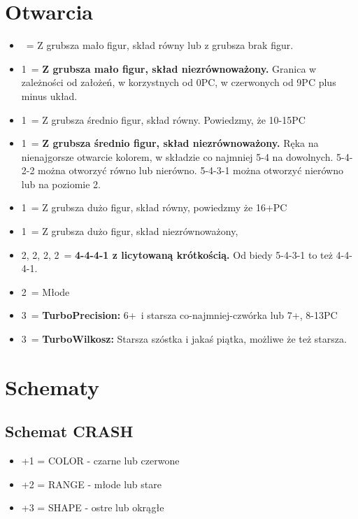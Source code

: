 \documentclass[12pt, a4paper]{article}
\begin{document}
\section{Otwarcia}
\begin{itemize}
    \item \pass\ = Z grubsza mało figur, skład równy lub z grubsza brak figur.
    \item 1\clubs\ = \textbf{Z grubsza mało figur, skład niezrównoważony.} Granica w zależności od założeń, w korzystnych od 0PC,
    w czerwonych od 9PC plus minus układ.
    \item 1\diams\ = Z grubsza średnio figur, skład równy. Powiedzmy, że 10-15PC
    \item 1\hearts\ = \textbf{Z grubsza średnio figur, skład niezrównoważony.}
    Ręka na nienajgorsze otwarcie kolorem, w składzie co najmniej 5-4 na dowolnych. 5-4-2-2 można otworzyć równo lub nierówno.
    5-4-3-1 można otworzyć nierówno lub na poziomie 2.
    \item 1\spades\ = Z grubsza dużo figur, skład równy, powiedzmy że 16+PC \fonce 
    \item 1\nt\ = Z grubsza dużo figur, skład niezrównoważony, \fonce
    \br
    \item 2\clubs, 2\diams, 2\hearts, 2\spades\ = \textbf{4-4-4-1 z licytowaną krótkością.} Od biedy 5-4-3-1 to też 4-4-4-1.
    \br
    \item 2\nt\ = Młode
    \item 3\clubs\ = \textbf{TurboPrecision:} 6+\clubs\ i starsza co-najmniej-czwórka lub 7+\clubs, 8-13PC
    \item 3\diams\ = \textbf{TurboWilkosz:} Starsza szóstka i jakaś piątka, możliwe że też starsza.
\end{itemize}


\pagebreak
\section{Schematy}
\subsection{Schemat CRASH}
\begin{itemize}
    \item +1 = COLOR - czarne lub czerwone
    \item +2 = RANGE - młode lub stare
    \item +3 = SHAPE - ostre lub okrągłe
\end{itemize}
\end{document}
